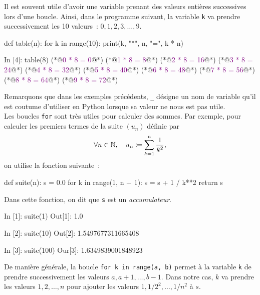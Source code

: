 \documentclass{magnolia}
\begin{document}
\vspace{2ex}
Il est souvent utile d'avoir une variable prenant des valeurs entières successives lors d'une
boucle. Ainsi, dans le programme suivant, la variable \verb_k_ va prendre successivement
les 10 valeurs~: $0, 1, 2, 3,\ldots, 9$.

\begin{pythoncodeline}
def table(n):
    for k in range(10):
        print(k, "*", n, "=", k * n)
\end{pythoncodeline}

\begin{pythoncode}
In [4]: table(8)
(*@\textcolor{purple}{0 * 8 = 0}@*)
(*@\textcolor{purple}{1 * 8 = 8}@*)
(*@\textcolor{purple}{2 * 8 = 16}@*)
(*@\textcolor{purple}{3 * 8 = 24}@*)
(*@\textcolor{purple}{4 * 8 = 32}@*)
(*@\textcolor{purple}{5 * 8 = 40}@*)
(*@\textcolor{purple}{6 * 8 = 48}@*)
(*@\textcolor{purple}{7 * 8 = 56}@*)
(*@\textcolor{purple}{8 * 8 = 64}@*)
(*@\textcolor{purple}{9 * 8 = 72}@*)
\end{pythoncode}
\noindent Remarquons que dans les exemples précédents, \verb!_! désigne un nom de
variable qu'il est coutume d'utiliser en Python lorsque sa valeur ne nous est pas utile.\\

Les boucles \verb_for_ sont très utiles pour calculer des sommes.
Par exemple, pour calculer les premiers termes de la suite $(u_n)$ définie par
\[\forall n\in\mathbb{N} ,\quad u_n \coloneqq \sum_{k=1}^n \frac{1}{k^2},\]
on utilise la fonction suivante~:
\begin{pythoncodeline}
def suite(n):
    s = 0.0
    for k in range(1, n + 1):
        s = s + 1 / k**2
    return s
\end{pythoncodeline}
Dans cette fonction, on dit que \verb_s_ est un \emph{accumulateur}.
\begin{pythoncode}
In [1]: suite(1)
Out[1]: 1.0

In [2]: suite(10)
Out[2]: 1.5497677311665408

In [3]: suite(100)
Our[3]: 1.6349839001848923
\end{pythoncode}
De manière générale, la boucle \verb!for k in range(a, b)! permet à la variable \verb_k_ de prendre successivement
les valeurs $a, a+1, \ldots, b-1$. Dans notre cas, $k$ va prendre les valeurs
$1, 2, \ldots, n$ pour ajouter les valeurs $1, 1/2^2,\ldots,1/n^2$ à $s$.\\
\end{document}
